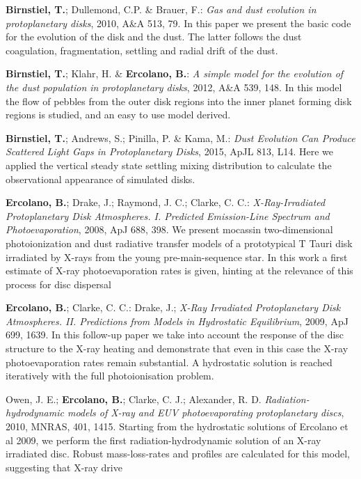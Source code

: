 \documentclass[10pt,fleqn,twoside]{article}
\begin{document}
\begin{literature}
\item {\bf Birnstiel, T.}; Dullemond, C.P. \& Brauer, F.: \textit{Gas and
dust evolution in protoplanetary disks}, 2010, A\&A 513, 79. In this paper we
  present the basic code for the evolution of the disk and the dust. The
  latter follows the dust coagulation, fragmentation, settling and radial
  drift of the dust.
\item{\bf Birnstiel, T.}; Klahr, H. \& {\bf Ercolano, B.}: \textit{A simple model
for the evolution of the dust population in protoplanetary disks}, 
  2012, A\&A 539, 148. In this model the flow of pebbles from the outer
  disk regions into the inner planet forming disk regions is studied,
  and an easy to use model derived.
\item {\bf Birnstiel, T.}; Andrews, S.; Pinilla, P. \& Kama, M.:
\textit{Dust Evolution Can Produce Scattered Light Gaps in Protoplanetary Disks},
2015, ApJL 813, L14. Here we applied the vertical steady state
settling mixing distribution to calculate the observational appearance
of simulated disks.
\item {\bf Ercolano, B.}; Drake, J.; Raymond, J. C.; Clarke, C. C.:
\textit{X-Ray-Irradiated Protoplanetary Disk Atmospheres. I. Predicted Emission-Line Spectrum and Photoevaporation},
2008, ApJ 688, 398. We present mocassin two-dimensional
photoionization and dust radiative transfer models of a prototypical T
Tauri disk irradiated by X-rays from the young pre-main-sequence
star. In this work a first estimate of X-ray photoevaporation rates is
given, hinting at the relevance of this process for disc dispersal
\item {\bf Ercolano, B.}; Clarke, C. C.: Drake, J.;
\textit{X-Ray Irradiated Protoplanetary Disk Atmospheres. II. Predictions from Models in Hydrostatic Equilibrium},
2009, ApJ 699, 1639. In this follow-up paper we take into account the
response of the disc structure to the X-ray heating and demonstrate
that even in this case the X-ray photoevaporation rates remain
substantial. A hydrostatic solution is reached iteratively with the
full photoionisation problem. 
\item Owen, J. E.; {\bf Ercolano, B.}; Clarke, C. J.; Alexander, R. D.
\textit{Radiation-hydrodynamic models of X-ray and EUV photoevaporating protoplanetary discs},
2010, MNRAS, 401, 1415. Starting from the hydrostatic solutions of
Ercolano et al 2009, we perform the first radiation-hydrodynamic
solution of an X-ray irradiated disc. Robust mass-loss-rates and
profiles are calculated for this model, suggesting that X-ray drive

\end{literature}
\end{document}
